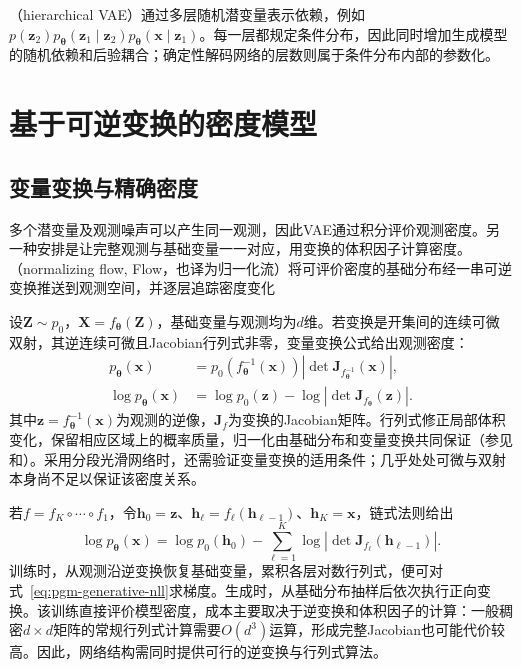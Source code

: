 （hierarchical VAE）通过多层随机潜变量表示依赖，例如$p(\bm{z}_2)p_{\bm{\theta}}(\bm{z}_1\mid\bm{z}_2)p_{\bm{\theta}}(\bm{x}\mid\bm{z}_1)$。每一层都规定条件分布，因此同时增加生成模型的随机依赖和后验耦合；确定性解码网络的层数则属于条件分布内部的参数化。

\section{基于可逆变换的密度模型}
\label{sec:pgm-generative-flows}

\subsection{变量变换与精确密度}
\label{sec:pgm-generative-change-of-variables}

多个潜变量及观测噪声可以产生同一观测，因此VAE通过积分评价观测密度。另一种安排是让完整观测与基础变量一一对应，用变换的体积因子计算密度。（normalizing flow, Flow，也译为归一化流）将可评价密度的基础分布经一串可逆变换推送到观测空间，并逐层追踪密度变化

设$\bm Z\sim p_0$，$\bm X=f_{\bm\theta}(\bm Z)$，基础变量与观测均为$d$维。若变换是开集间的连续可微双射，其逆连续可微且Jacobian行列式非零，变量变换公式给出观测密度：
\begin{equation}
  \label{eq:pgm-generative-flow-density}
  \begin{aligned}
    p_{\bm{\theta}}(\bm{x})
      &=p_0(f_{\bm{\theta}}^{-1}(\bm{x}))
         \left|\det\bm{J}_{f_{\bm{\theta}}^{-1}}(\bm{x})\right|,\\
    \log p_{\bm{\theta}}(\bm{x})
      &=\log p_0(\bm{z})-
         \log\left|\det\bm{J}_{f_{\bm{\theta}}}(\bm{z})\right|.
  \end{aligned}
\end{equation}
其中$\bm z=f_{\bm\theta}^{-1}(\bm x)$为观测的逆像，$\bm J_f$为变换的Jacobian矩阵。行列式修正局部体积变化，保留相应区域上的概率质量，归一化由基础分布和变量变换共同保证（参见和）。采用分段光滑网络时，还需验证变量变换的适用条件；几乎处处可微与双射本身尚不足以保证该密度关系。

若$f=f_K\circ\cdots\circ f_1$，令$\bm{h}_0=\bm{z}$、$\bm{h}_{\ell}=f_{\ell}(\bm{h}_{\ell-1})$、$\bm{h}_K=\bm{x}$，链式法则给出
\begin{equation}
  \label{eq:pgm-generative-flow-composition}
  \log p_{\bm{\theta}}(\bm{x})
  =\log p_0(\bm{h}_0)
   -\sum_{\ell=1}^{K}
      \log|\det\bm{J}_{f_{\ell}}(\bm{h}_{\ell-1})|.
\end{equation}
训练时，从观测沿逆变换恢复基础变量，累积各层对数行列式，便可对式~\eqref{eq:pgm-generative-nll}求梯度。生成时，从基础分布抽样后依次执行正向变换。该训练直接评价模型密度，成本主要取决于逆变换和体积因子的计算：一般稠密$d\times d$矩阵的常规行列式计算需要$O(d^3)$运算，形成完整Jacobian也可能代价较高。因此，网络结构需同时提供可行的逆变换与行列式算法。

